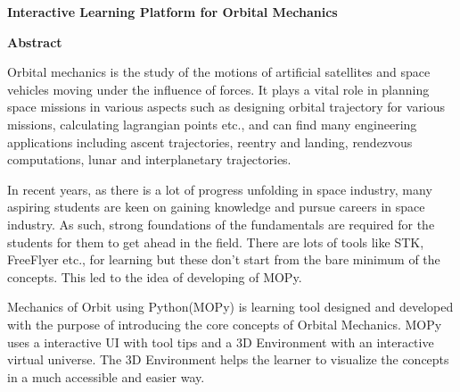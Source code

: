 \thispagestyle{plain}
\begin{center}
    \Large
    \textbf{Interactive Learning Platform for Orbital Mechanics}
    
    \vspace{0.9cm}
    \textbf{Abstract}
\end{center}
\hspace{4em}Orbital mechanics is the study of the motions of artificial satellites and space vehicles moving under the influence of forces. It plays a vital role in planning space missions in various aspects such as designing orbital trajectory for various missions, calculating lagrangian points etc., and can find many engineering applications  including ascent trajectories, reentry and landing, rendezvous computations, lunar and interplanetary trajectories. 

In recent years, as there is a lot of progress unfolding in space industry, many aspiring students are keen on gaining knowledge and pursue careers in space industry. As such, strong foundations of the fundamentals are required for the students for them to get ahead in the field. There are lots of tools like STK, FreeFlyer etc., for learning but these don't start from the bare minimum of the concepts. This led to the idea of developing of MOPy.

Mechanics of Orbit using Python(MOPy) is learning tool designed and developed with the purpose of introducing the core concepts of Orbital Mechanics. MOPy uses a interactive UI with tool tips and a 3D Environment with an interactive virtual universe. The 3D Environment helps the learner to visualize the concepts in a much accessible and easier way.